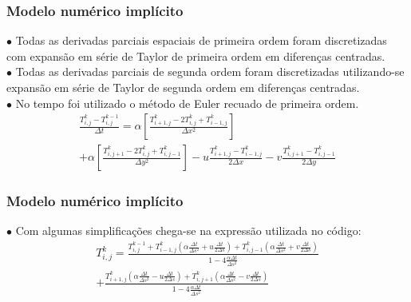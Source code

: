 \documentclass[xcolor=dvipsnames,10pt,aspectratio=169]{beamer}
\begin{document}
	\begin{frame}
		\frametitle{Modelo numérico implícito}
		$\bullet$ Todas as derivadas parciais espaciais de primeira ordem foram discretizadas com expansão em série de Taylor de primeira ordem em diferenças centradas.\\
		$\bullet$ Todas as derivadas parciais de segunda ordem foram discretizadas utilizando-se expansão em série de Taylor de segunda ordem em diferenças centradas.\\
		$\bullet$ No tempo foi utilizado o método de Euler recuado de primeira ordem.\\
		\begin{equation}
			\begin{split}
			\frac{T_{i,j}^{k} - T_{i , j}^{k-1} }{\Delta t}
			= \alpha \left[  \frac{T_{i+1,j}^{k} - 2 T_{i,j}^{k} + T_{i-1,j}^{k} }{\Delta x^2} \right]\\
			+\alpha \left[\frac{T_{i,j+1}^{k} - 2 T_{i,j}^{k} + T_{i,j-1}^{k}}{\Delta y^2}\right] - u \frac{T_{i+1,j}^{k} - T_{i-1,j}^{k}}{2 \Delta x} - v \frac{T_{i,j+1}^{k} - T_{i , j-1}^{k}}{2 \Delta y}
			\end{split}
		\end{equation}
	\end{frame}





	\begin{frame}
		\frametitle{Modelo numérico implícito}
		$\bullet$ Com algumas simplificações chega-se na expressão utilizada no código:
		\begin{equation}
			\begin{split}
			T_{i,j}^{k} = \frac{T_{i,j}^{k-1} + T_{i -1, j}^{k} \left( \alpha \frac{\Delta t}{\Delta s^2} + u \frac{\Delta t}{2 \Delta s} \right) 	+ T_{i,j-1}^{k} \left( \alpha \frac{\Delta t}{\Delta s^2} + v \frac{\Delta t}{2 \Delta s} \right)}{ 1 - 4 \frac{\alpha \Delta t}{\Delta s ^2}} \\
			+ \frac{  T_{i+1,j}^{k} \left( \alpha \frac{\Delta t}{ \Delta s^2} - u \frac{\Delta t}{2 \Delta s}\right)
			+  T_{i,j+1}^{k} \left( \alpha \frac{\Delta t}{\Delta s^2} - v \frac{\Delta t}{2 \Delta s}\right)}{ 1 - 4 \frac{\alpha \Delta t}{\Delta s ^2}}
			\end{split}
		\end{equation}
	\end{frame}
\end{document}
